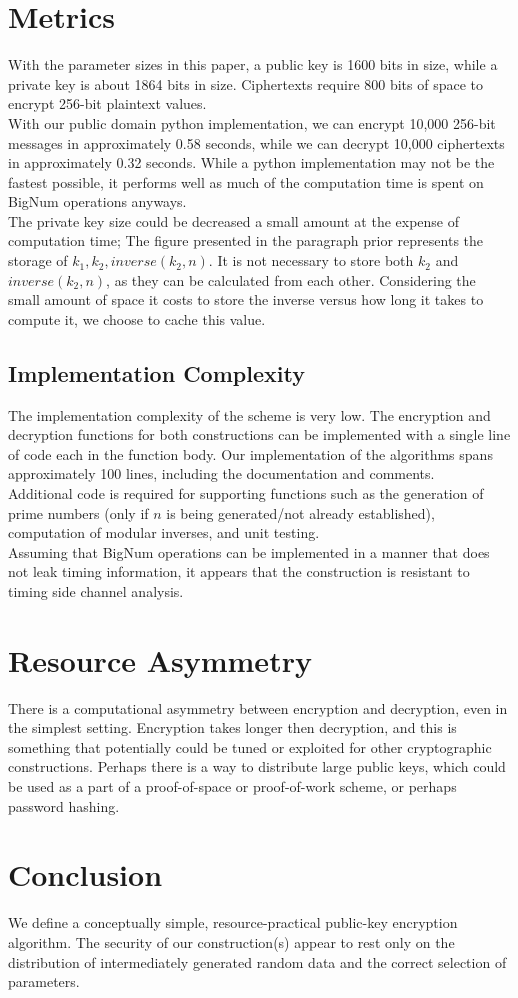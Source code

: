 \documentclass[preprint]{iacrtrans}
\begin{document}
\section{Metrics}
With the parameter sizes in this paper, a public key is 1600 bits in size, while a private key is about 1864 bits in size. Ciphertexts require 800 bits of space to encrypt 256-bit plaintext values. \\

With our public domain python implementation, we can encrypt 10,000 256-bit messages in approximately 0.58 seconds, while we can decrypt 10,000 ciphertexts in approximately 0.32 seconds. While a python implementation may not be the fastest possible, it performs well as much of the computation time is spent on BigNum operations anyways. \\

The private key size could be decreased a small amount at the expense of computation time; The figure presented in the paragraph prior represents the storage of $k_1, k_2, inverse(k_2, n)$. It is not necessary to store both $k_2$ and $inverse(k_2, n)$, as they can be calculated from each other. Considering the small amount of space it costs to store the inverse versus how long it takes to compute it, we choose to cache this value.

\subsection{Implementation Complexity}
The implementation complexity of the scheme is very low. The encryption and decryption functions for both constructions can be implemented with a single line of code each in the function body. Our implementation of the algorithms spans approximately 100 lines, including the documentation and comments.\\

Additional code is required for supporting functions such as the generation of prime numbers (only if $n$ is being generated/not already established), computation of modular inverses, and unit testing. \\

Assuming that BigNum operations can be implemented in a manner that does not leak timing information, it appears that the construction is resistant to timing side channel analysis.

\section{Resource Asymmetry}
There is a computational asymmetry between encryption and decryption, even in the simplest setting. Encryption takes longer then decryption, and this is something that potentially could be tuned or exploited for other cryptographic constructions. Perhaps there is a way to distribute large public keys, which could be used as a part of a proof-of-space or proof-of-work scheme, or perhaps password hashing.

\section{Conclusion}
We define a conceptually simple, resource-practical public-key encryption algorithm. The security of our construction(s) appear to rest only on the distribution of intermediately generated random data and the correct selection of parameters.
\end{document}
